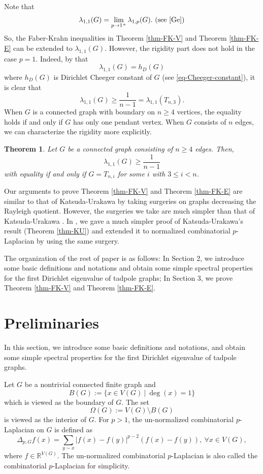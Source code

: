 \documentclass[12pt]{amsart}
\def\R{\mathbb{R}}
\newtheorem{thm}{Theorem}[section]
\theoremstyle{definition}
\theoremstyle{remark}
\numberwithin{equation}{section}
\begin{document}
Note that 
$$\lambda_{1,1}(G)=\lim_{p\to 1^+}\lambda_{1,p}(G).\ \mbox{(see \cite{Ge})}$$
So, the Faber-Krahn inequalities in Theorem \ref{thm-FK-V} and Theorem \ref{thm-FK-E} can be extended to $\lambda_{1,1}(G)$. However, the rigidity part does not hold in the case $p=1$. Indeed, by that 
$$\lambda_{1,1}(G)=h_D(G)$$ 
where $h_D(G)$ is Dirichlet Cheeger constant of $G$ (see \eqref{eq-Cheeger-constant}), it is clear that 
$$\lambda_{1,1}(G)\geq\frac{1}{n-1}=\lambda_{1,1}(T_{n,3}).$$
When $G$ is a connected graph with boundary on $n\geq 4$ vertices, the equality holds if and only if $G$ has only one pendant vertex. When $G$ consists of $n$ edges, we can characterize the rigidity more explicitly.
\begin{thm}\label{thm-FK-1}
Let $G$ be a connected graph consisting of $n\geq 4$ edges. Then, 
$$\lambda_{1,1}(G)\geq \frac{1}{n-1}$$
with equality if and only if $G=T_{n,i}$ for some $i$ with $3\leq i<n$.
\end{thm}


Our arguments to prove Theorem \ref{thm-FK-V} and Theorem \ref{thm-FK-E} are similar to that of Katsuda-Urakawa \cite{KU} by taking surgeries on graphs decreasing the Rayleigh quotient.  However, the surgeries we take are much simpler than that  of Katsuda-Urakawa \cite{KU}. In \cite{HY}, we gave a much simpler proof of Katsuda-Urakawa's result (Theorem \ref{thm-KU}) and extended it to normalized combinatorial $p$-Laplacian by using the same surgery.

The organization of the rest of paper is as follows: In Section 2, we introduce some basic definitions and notations and obtain some simple spectral properties for the first Dirichlet eigenvalue of tadpole graphs; In Section 3, we prove Theorem \ref{thm-FK-V} and Theorem \ref{thm-FK-E}.
\section{Preliminaries}
In this section, we introduce some basic definitions and notations, and obtain some simple spectral properties for the first Dirichlet eigenvalue of tadpole graphs.

Let $G$ be a nontrivial connected finite graph and
$$B(G):=\{x\in V(G)\ |\ \deg(x)=1\}$$
which is viewed as the boundary of $G$. The set
$$\Omega(G):=V(G)\setminus B(G)$$
is viewed as the interior of $G$. For $p>1$, the un-normalized combinatorial $p$-Laplacian on $G$ is defined as
$$\Delta_{p,G} f(x)=\sum_{y\sim x}|f(x)-f(y)|^{p-2}(f(x)-f(y)),\ \forall x\in V(G),$$
where $f\in \R^{V(G)}$. The un-normalized combinatorial $p$-Laplacian is also called the combinatorial $p$-Laplacian for simplicity.
\end{document}
